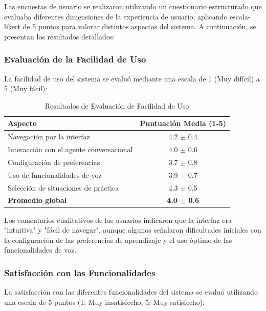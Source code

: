 Las encuestas de usuario se realizaron utilizando un cuestionario estructurado que evaluaba diferentes dimensiones de la experiencia de usuario, aplicando \gls{escala-likert} de 5 puntos para valorar distintos aspectos del sistema. A continuación, se presentan los resultados detallados:

\subsubsection{Evaluación de la Facilidad de Uso}
\label{subsubsec:facilidad_uso}

La facilidad de uso del sistema se evaluó mediante una escala de 1 (Muy difícil) a 5 (Muy fácil):

\begin{table}[h]
\centering
\caption{Resultados de Evaluación de Facilidad de Uso}
\label{table:facilidad_uso}
\begin{tabular}{|l|c|}
\hline
\textbf{Aspecto} & \textbf{Puntuación Media (1-5)} \\
\hline
Navegación por la interfaz & 4.2 $\pm$ 0.4 \\
\hline
Interacción con el agente conversacional & 4.0 $\pm$ 0.6 \\
\hline
Configuración de preferencias & 3.7 $\pm$ 0.8 \\
\hline
Uso de funcionalidades de voz & 3.9 $\pm$ 0.7 \\
\hline
Selección de situaciones de práctica & 4.3 $\pm$ 0.5 \\
\hline
\textbf{Promedio global} & \textbf{4.0 $\pm$ 0.6} \\
\hline
\end{tabular}
\end{table}

Los comentarios cualitativos de los usuarios indicaron que la interfaz era "intuitiva" y "fácil de navegar", aunque algunos señalaron dificultades iniciales con la configuración de las preferencias de aprendizaje y el uso óptimo de las funcionalidades de voz.

\subsubsection{Satisfacción con las Funcionalidades}
\label{subsubsec:satisfaccion_funcionalidades}

La satisfacción con las diferentes funcionalidades del sistema se evaluó utilizando una escala de 5 puntos (1: Muy insatisfecho, 5: Muy satisfecho):

